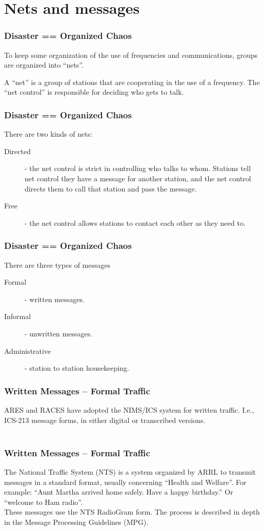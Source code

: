 \documentclass[10pt]{beamer}
\begin{document}
\section{Nets and messages}
\begin{frame}
\frametitle{Disaster == Organized Chaos}
To keep some organization of the use of frequencies and communications,  groups are organized into “nets”.

A “net” is a group of stations that are cooperating in the use of a frequency. The “net control” is responsible for deciding who gets to talk. 
\end{frame}

\begin{frame}
\frametitle{Disaster == Organized Chaos}
There are two kinds of nets:
 \begin{description}
\item[Directed] - the net control is strict in controlling who talks to whom.  Stations tell net control they have a message for another station, and the net control directs them to call that station and pass the message.
\item[Free] - the net control allows stations to contact each other as they need to.   
\end{description}
\end{frame}

\begin{frame}
\frametitle{Disaster == Organized Chaos}
There are three types of messages
\begin{description}
\item[Formal] - written messages.
\item[Informal] - unwritten messages.
\item[Administrative] - station to station housekeeping.
\end{description}
\end{frame}

\begin{frame}
\frametitle{Written Messages – Formal Traffic}
ARES and RACES have adopted the NIMS/ICS system for written traffic. I.e., ICS-213 message forms, in either digital or transcribed versions.\\ \hfil \\
 
\end{frame}

\begin{frame}
\frametitle{Written Messages – Formal Traffic}
The National Traffic System (NTS) is a system organized by ARRL to transmit messages in a standard format, usually concerning “Health and Welfare”. For example: “Aunt Martha arrived home safely. Have a happy birthday.”  Or “welcome to Ham radio”. \\

These messages use the NTS RadioGram form. The process is described in depth in the Message Processing Guidelines (MPG).
\end{frame}
\end{document}
